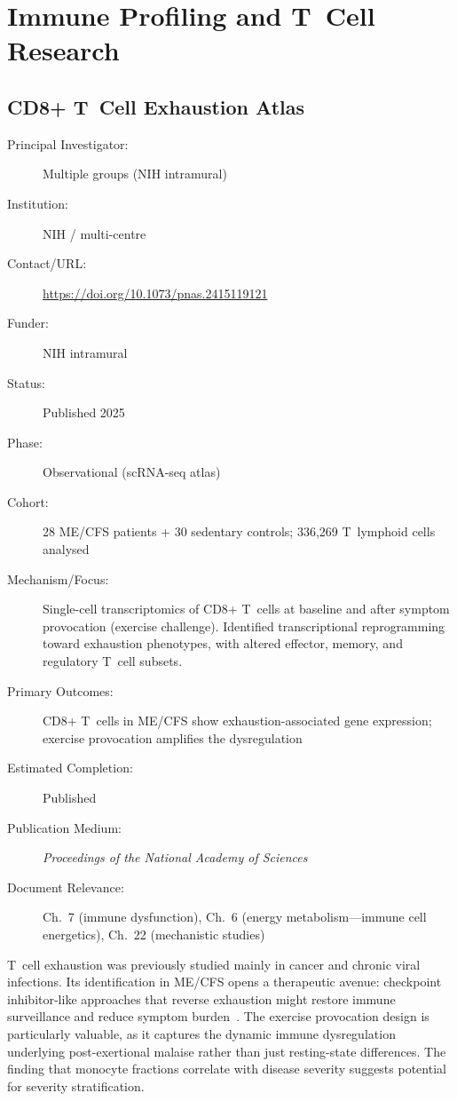 \section{Immune Profiling and T~Cell Research}
\label{sec:registry-immune-profiling}

\subsection{CD8+ T~Cell Exhaustion Atlas}
\label{sec:registry-tcell-exhaustion}

\begin{description}
    \item[Principal Investigator:] Multiple groups (NIH intramural)
    \item[Institution:] NIH / multi-centre
    \item[Contact/URL:] \url{https://doi.org/10.1073/pnas.2415119121}
    \item[Funder:] NIH intramural
    \item[Status:] Published 2025
    \item[Phase:] Observational (scRNA-seq atlas)
    \item[Cohort:] 28 ME/CFS patients + 30 sedentary controls; 336,269
        T~lymphoid cells analysed
    \item[Mechanism/Focus:] Single-cell transcriptomics of CD8+ T~cells at
        baseline and after symptom provocation (exercise challenge).
        Identified transcriptional reprogramming toward exhaustion phenotypes,
        with altered effector, memory, and regulatory T~cell subsets.
    \item[Primary Outcomes:] CD8+ T~cells in ME/CFS show exhaustion-associated
        gene expression; exercise provocation amplifies the dysregulation
    \item[Estimated Completion:] Published
    \item[Publication Medium:] \textit{Proceedings of the National Academy
        of Sciences}
    \item[Document Relevance:] Ch.~7 (immune dysfunction), Ch.~6 (energy
        metabolism---immune cell energetics), Ch.~22 (mechanistic studies)
\end{description}

T~cell exhaustion was previously studied mainly in cancer and chronic viral
infections.  Its identification in ME/CFS opens a therapeutic avenue:
checkpoint inhibitor-like approaches that reverse exhaustion might restore
immune surveillance and reduce symptom
burden~\cite{Mayer2025Tcellexhaustion}.  The exercise provocation design is
particularly valuable, as it captures the dynamic immune dysregulation
underlying post-exertional malaise rather than just resting-state
differences.  The finding that monocyte fractions correlate with disease
severity suggests potential for severity stratification.

